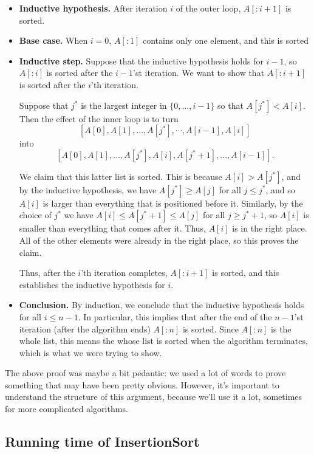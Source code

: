 \documentclass [12pt]{article}
\begin{document}
\begin{itemize}
    \item \textbf{Inductive hypothesis.} After iteration $i$ of the outer loop, $A[:i+1]$ is sorted.
    \item \textbf{Base case.} When $i = 0$, $A[:1]$ contains only one element, and this is sorted
    \item \textbf{Inductive step.} Suppose that the inductive hypothesis holds for $i - 1$, so $A[:i]$ is sorted after the $i-1$’st iteration. We want to show that $A[:i+1]$ is sorted after the $i$’th iteration.
    
    Suppose that $j^*$ is the largest integer in $\{0, \dots , i - 1\}$ so that $A[j^*] < A[i]$. Then the effect of the inner loop is to turn 
    $$
        [A[0], A[1], \dots , A[j^*], \cdots , A[i - 1], A[i]]
    $$
    into
    $$
        [A[0], A[1], \dots , A[j^*], A[i], A[j^* + 1], . . . , A[i - 1]].
    $$

    We claim that this latter list is sorted. This is because $A[i] > A[j^*]$, and by the inductive hypothesis, we have $A[j^*] \geq A[j]$ for all $j \leq j^*$, and so $A[i]$ is larger than everything that is positioned before it. Similarly, by the choice of $j^*$ we have $A[i] \leq A[j^* + 1] \leq A[j]$ for all $j \geq j^* + 1$, so $A[i]$ is smaller than everything that comes after it. Thus, $A[i]$ is in the right place. All of the other elements were already in the right place, so this proves the claim.

    Thus, after the $i$’th iteration completes, $A[:i+1]$ is sorted, and this establishes the inductive hypothesis for $i$.
    \item \textbf{Conclusion.} By induction, we conclude that the inductive hypothesis holds for all $i \leq n - 1$. In particular, this implies that after the end of the $n - 1$’st iteration (after the algorithm ends) $A[:n]$ is sorted. Since $A[:n]$ is the whole list, this means the whose list is sorted when the algorithm terminates, which is what we were trying to show.
\end{itemize}

The above proof was maybe a bit pedantic: we used a lot of words to prove something that may have been pretty obvious. However, it’s important to understand the structure of this argument, because we’ll use it a lot, sometimes for more complicated algorithms.


\subsection{Running time of InsertionSort}
\end{document}
